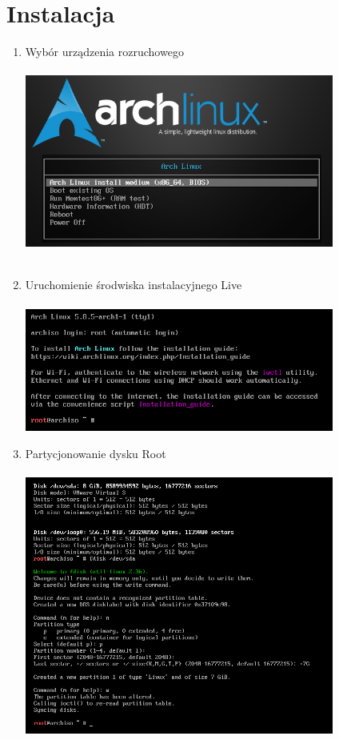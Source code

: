 \documentclass[10pt,a4paper]{article}
\begin{document}
\newpage

\section{Instalacja\\}

\begin{enumerate}

\item Wybór urządzenia rozruchowego\\\\
\includegraphics[width=0.8\textwidth, center]{arch1.png}\\\\
\item Uruchomienie środwiska instalacyjnego Live\\\\
\includegraphics[width=0.8\textwidth, center]{arch2.png}
\newpage
\item Partycjonowanie dysku Root\\\\
\includegraphics[width=0.8\textwidth, center]{arch3.png}\\\\

\end{enumerate}
\end{document}
